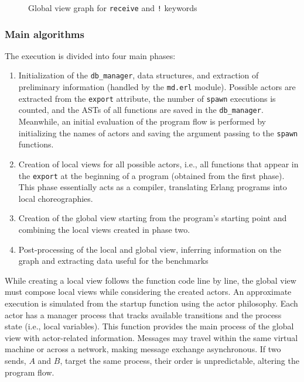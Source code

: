 \begin{figure}[!ht]
    \centering
    \caption{Global view graph for \texttt{receive} and \texttt{!} keywords}
    \label{grafo:sendrecv}
\end{figure}


\subsubsection{Main algorithms}
\noindent The execution is divided into four main phases:
\begin{enumerate}
\item Initialization of the \texttt{db\_manager}, data structures, and
extraction of preliminary information (handled by the
\texttt{md.erl} module). Possible actors are extracted from
the \texttt{export} attribute, the number of \texttt{spawn}
executions is counted, and the ASTs of all functions are saved in
the \texttt{db\_manager}. Meanwhile, an initial evaluation of the
program flow is performed by initializing the names of actors and
saving the argument passing to the \texttt{spawn} functions.

\item Creation of local views for all possible actors, i.e., all functions
that appear in the \texttt{export} at the beginning of a program
(obtained from the first phase). This phase essentially acts as a compiler, 
translating Erlang programs into local choreographies.

\item Creation of the global view starting from the program's starting
point and combining the local views created in phase two.

\item Post-processing of the local and global view, inferring information on the
graph and extracting data useful for the benchmarks
\end{enumerate}

While creating a local view follows the function code line by line, the global  
view must compose local views while considering the created actors. An  
approximate execution is simulated from the startup function using the actor  
philosophy. Each actor has a manager process that tracks available transitions  
and the process state (i.e., local variables). This function provides the main  
process of the global view with actor-related information. Messages may travel  
within the same virtual machine or across a network, making message exchange  
asynchronous. If two sends, $A$ and $B$, target the same process, their order  
is unpredictable, altering the program flow.  

